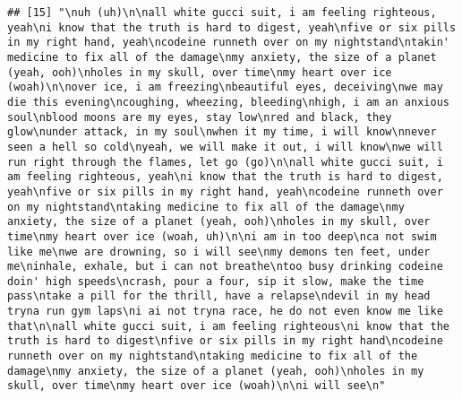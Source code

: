 \documentclass[]{article}
\begin{document}
\begin{verbatim}
## [15] "\nuh (uh)\n\nall white gucci suit, i am feeling righteous, yeah\ni know that the truth is hard to digest, yeah\nfive or six pills in my right hand, yeah\ncodeine runneth over on my nightstand\ntakin' medicine to fix all of the damage\nmy anxiety, the size of a planet (yeah, ooh)\nholes in my skull, over time\nmy heart over ice (woah)\n\nover ice, i am freezing\nbeautiful eyes, deceiving\nwe may die this evening\ncoughing, wheezing, bleeding\nhigh, i am an anxious soul\nblood moons are my eyes, stay low\nred and black, they glow\nunder attack, in my soul\nwhen it my time, i will know\nnever seen a hell so cold\nyeah, we will make it out, i will know\nwe will run right through the flames, let go (go)\n\nall white gucci suit, i am feeling righteous, yeah\ni know that the truth is hard to digest, yeah\nfive or six pills in my right hand, yeah\ncodeine runneth over on my nightstand\ntaking medicine to fix all of the damage\nmy anxiety, the size of a planet (yeah, ooh)\nholes in my skull, over time\nmy heart over ice (woah, uh)\n\ni am in too deep\nca not swim like me\nwe are drowning, so i will see\nmy demons ten feet, under me\ninhale, exhale, but i can not breathe\ntoo busy drinking codeine doin' high speeds\ncrash, pour a four, sip it slow, make the time pass\ntake a pill for the thrill, have a relapse\ndevil in my head tryna run gym laps\ni ai not tryna race, he do not even know me like that\n\nall white gucci suit, i am feeling righteous\ni know that the truth is hard to digest\nfive or six pills in my right hand\ncodeine runneth over on my nightstand\ntaking medicine to fix all of the damage\nmy anxiety, the size of a planet (yeah, ooh)\nholes in my skull, over time\nmy heart over ice (woah)\n\ni will see\n"                                                                                                                                                                                                                                                                                                                                                                                                                                                                                                                                                                                                                                                                                                                                                                                                                                                                                                                                                                                                                                                                                                                                                                                                                                                                                                                                                                                                                                                                                                                                                                                                                                    
\end{verbatim}
\end{document}
